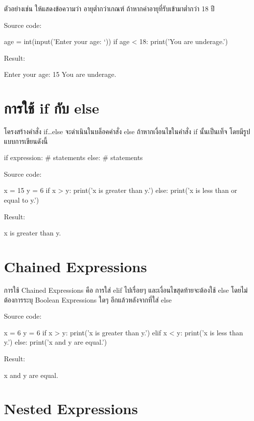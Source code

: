 ตัวอย่างเช่น ให้แสดงข้อความว่า อายุต่ำกว่าเกณฑ์ ถ้าหากค่าอายุที่รับเข้ามาต่ำกว่า 18 ปี

Source code:
\begin{codelist}{}{}
age = int(input('Enter your age: `))
if age < 18:
   print('You are underage.')
\end{codelist}

Result:
\begin{codelist}{}{}
Enter your age: 15
You are underage.
\end{codelist}


\section{การใช้ if กับ else}

โครงสร้างคำสั่ง if…else จะดำเนินในบล็อคคำสั่ง else ถ้าหากเงื่อนไขในคำสั่ง if นั้นเป็นเท็จ โดยมีรูปแบบการเขียนดังนี้

\begin{codelist}{}{}
if expression:
    # statements
else:
    # statements
\end{codelist}

Source code:
\begin{codelist}{}{}
x = 15
y = 6
if x > y: print('x is greater than y.')
else: print('x is less than or equal to y.')
\end{codelist}

Result:
\begin{codelist}{}{}
x is greater than y.
\end{codelist}


\section{Chained Expressions}

การใช้ Chained Expressions คือ การใส่ elif ไปเรื่อยๆ และเงื่อนไขสุดท้ายจะต้องใช้ else โดยไม่ต้องการระบุ Boolean Expressions ใดๆ อีกแล้วหลังจากที่ใส่ else

Source code:
\begin{codelist}{}{}
x = 6
y = 6
if x > y: print('x is greater than y.')
elif x < y: print('x is less than y.')
else: print('x and y are equal.')
\end{codelist}

Result:
\begin{codelist}{}{}
x and y are equal.
\end{codelist}


\section{Nested Expressions}

